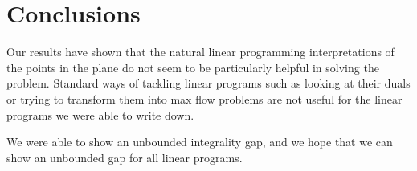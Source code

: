 \documentclass[11pt]{article}
\begin{document}
\section{Conclusions}

Our results have shown that the natural linear programming interpretations of the points in the plane do not seem to be particularly helpful in solving the problem. Standard ways of tackling linear programs such as looking at their duals or trying to transform them into max flow problems are not useful for the linear programs we were able to write down.

We were able to show an unbounded integrality gap, and we hope that we can show an unbounded gap for all linear programs.



\end{document}
